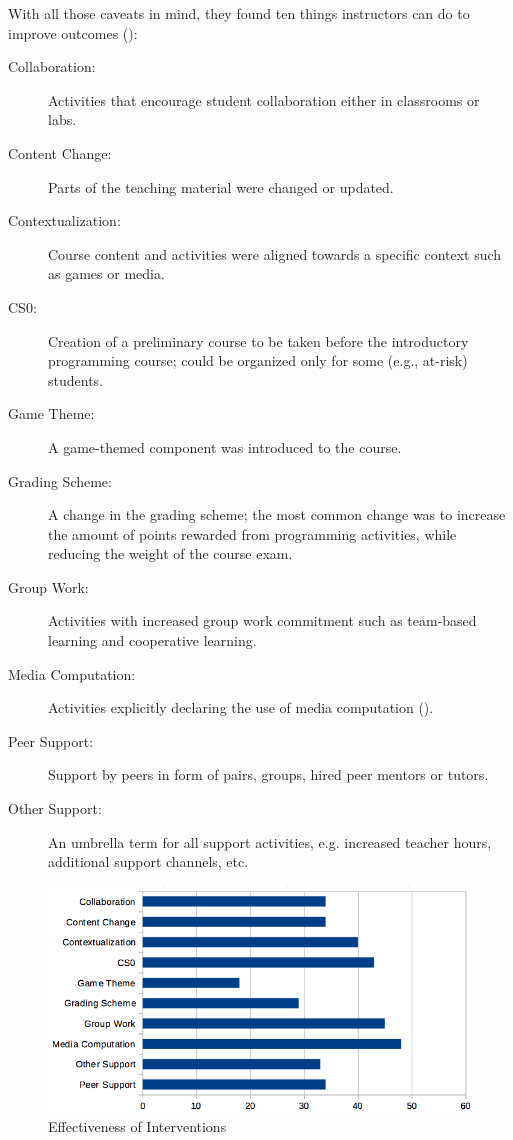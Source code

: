 With all those caveats in mind, they found ten things instructors can do
to improve outcomes ():

\begin{description}
\item[Collaboration:]
Activities that encourage student collaboration either in classrooms
or labs.
\item[Content Change:]
Parts of the teaching material were changed or updated.
\item[Contextualization:]
Course content and activities were aligned towards a specific
context such as games or media.
\item[CS0:]
Creation of a preliminary course to be taken before the introductory
programming course; could be organized only for some (e.g., at-risk)
students.
\item[Game Theme:]
A game-themed component was introduced to the course.
\item[Grading Scheme:]
A change in the grading scheme; the most common change was to
increase the amount of points rewarded from programming activities,
while reducing the weight of the course exam.
\item[Group Work:]
Activities with increased group work commitment such as team-based
learning and cooperative learning.
\item[Media Computation:]
Activities explicitly declaring the use of media computation
().
\item[Peer Support:]
Support by peers in form of pairs, groups, hired peer mentors or
tutors.
\item[Other Support:]
An umbrella term for all support activities, e.g. increased teacher
hours, additional support channels, etc.
\end{description}

\begin{figure}
\centering
\includegraphics{../../figures/interventions.png}
\caption{Effectiveness of Interventions}
\label{f:pck-interventions}
\end{figure}

